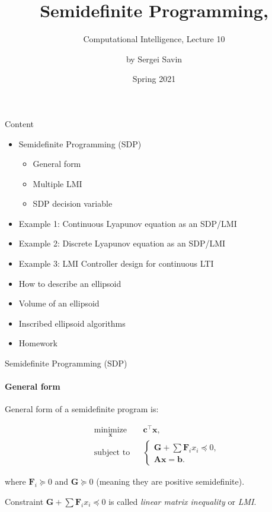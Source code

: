 \documentclass{beamer}
\title{Semidefinite Programming, }
\subtitle{Computational Intelligence, Lecture 10}
\author{by Sergei Savin}
\date{Spring 2021}
\begin{document}
\maketitle


\begin{frame}{Content}

\begin{itemize}
\item  Semidefinite Programming (SDP)
\begin{itemize}
    \item General form
    \item Multiple LMI
    \item SDP decision variable
\end{itemize}
\item  Example 1:  Continuous Lyapunov equation as an SDP/LMI
\item  Example 2:  Discrete Lyapunov equation as an SDP/LMI
\item  Example 3:  LMI Controller design for continuous LTI
\item How to describe an ellipsoid
\item Volume of an ellipsoid
\item Inscribed ellipsoid algorithms
\item Homework
\end{itemize}
\end{frame}



\begin{frame}{Semidefinite Programming (SDP)}
\framesubtitle{General form}
\begin{flushleft}

General form of a semidefinite program is:

%
\begin{equation}
\begin{aligned}
& \underset{\mathbf{x}}{\text{minimize}}
& & \mathbf{c}^\top\mathbf{x}, \\
& \text{subject to}
& & \begin{cases}
    \mathbf{G} + \sum \mathbf{F}_i x_i \preceq 0, \\
    \mathbf{A}\mathbf{x} = \mathbf{b}.
    \end{cases}
\end{aligned}
\end{equation}

where $\mathbf{F}_i \succeq 0$ and $\mathbf{G} \succeq 0$ (meaning they are positive semidefinite).

\bigskip

Constraint $\mathbf{G} + \sum \mathbf{F}_i x_i \preceq 0$ is called \emph{linear matrix inequality} or \emph{LMI}.
 
\end{flushleft}
\end{frame}
\end{document}
